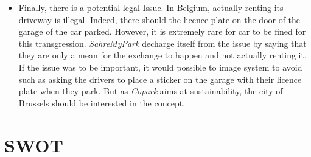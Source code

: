 \documentclass[12pt,a4paper,oneside]{book}
\newcommand{\bp}{\textit{Copark }}
\begin{document}
\begin{itemize}
\item Finally, there is a potential legal Issue. In Belgium, actually renting its driveway is illegal. Indeed, there should the licence plate on the door of the garage of the car parked. However, it is extremely rare for car to be fined for this transgression. \textit{SahreMyPark} decharge itself from the issue by saying that they are only a mean for the exchange to happen and not actually renting it.\cite{smprtbf} If the issue was to be important, it would possible to image system to avoid such as asking the drivers to place a sticker on the garage with their licence plate when they park. But as \bp aims at sustainability, the city of Brussels should be interested in the concept.

\end{itemize}


\section{SWOT}
\end{document}
